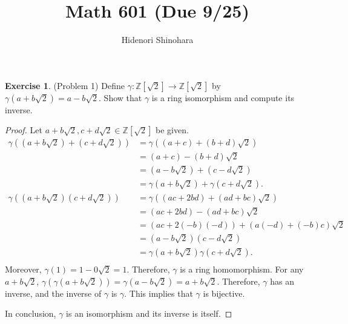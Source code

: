 \documentclass[12pt, psamsfonts]{amsart}
\theoremstyle{definition}
\newtheorem*{exer}{Exercise}
\theoremstyle{remark}
\numberwithin{equation}{section}
\begin{document}
\title{Math 601 (Due 9/25)}
\author{Hidenori Shinohara}
\maketitle

\begin{exer}{(Problem 1)}
  Define $\gamma: \mathbb{Z}[\sqrt{2}] \rightarrow \mathbb{Z}[\sqrt{2}]$ by $\gamma(a + b\sqrt{2}) = a - b\sqrt{2}$.
  Show that $\gamma$ is a ring isomorphism and compute its inverse.
\end{exer}

\begin{proof}
  Let $a + b\sqrt{2}, c + d\sqrt{2} \in \mathbb{Z}[\sqrt{2}]$ be given.
  \begin{align*}
    \gamma((a + b\sqrt{2}) + (c + d\sqrt{2}))
      &= \gamma((a + c) + (b + d)\sqrt{2}) \\
      &= (a + c) - (b + d)\sqrt{2} \\
      &= (a - b\sqrt{2}) + (c - d\sqrt{2}) \\
      &= \gamma(a + b\sqrt{2}) + \gamma(c + d\sqrt{2}). \\
    \gamma((a + b\sqrt{2})(c + d\sqrt{2}))
      &= \gamma((ac + 2bd) + (ad + bc)\sqrt{2}) \\
      &= (ac + 2bd) - (ad + bc)\sqrt{2} \\
      &= (ac + 2(-b)(-d)) + (a(-d) + (-b)c)\sqrt{2} \\
      &= (a - b\sqrt{2})(c - d\sqrt{2}) \\
      &= \gamma(a + b\sqrt{2})\gamma(c + d\sqrt{2}). \\
  \end{align*}
  Moreover, $\gamma(1) = 1 - 0\sqrt{2} = 1$.
  Therefore, $\gamma$ is a ring homomorphism.
  For any $a + b\sqrt{2}$, $\gamma(\gamma(a + b\sqrt{2})) = \gamma(a - b\sqrt{2}) = a + b\sqrt{2}$.
  Therefore, $\gamma$ has an inverse, and the inverse of $\gamma$ is $\gamma$.
  This implies that $\gamma$ is bijective.

  In conclusion, $\gamma$ is an isomorphism and its inverse is itself.
\end{proof}
\end{document}
